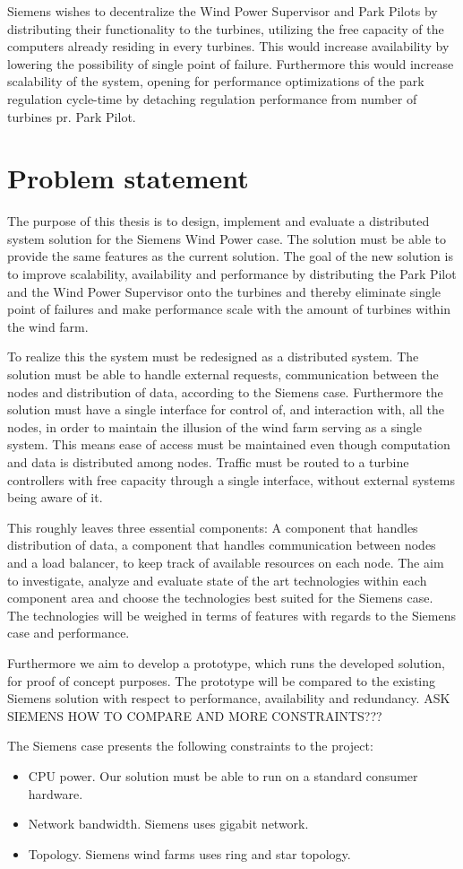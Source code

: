 Siemens wishes to decentralize the Wind Power Supervisor and Park Pilots by distributing their functionality to the turbines, utilizing the free capacity of the computers already residing in every turbines. This would increase availability by lowering the possibility of single point of failure. Furthermore this would increase scalability of the system, opening for performance optimizations of the park regulation cycle-time by detaching regulation performance from number of turbines pr. Park Pilot. 


\section{Problem statement}

The purpose of this thesis is to design, implement and evaluate a distributed system solution for the Siemens Wind Power case. The solution must be able to provide the same features as the current solution. The goal of the new solution is to improve scalability, availability and performance by distributing the Park Pilot and the Wind Power Supervisor onto the turbines and thereby eliminate single point of failures and make performance scale with the amount of turbines within the wind farm. 

To realize this the system must be redesigned as a distributed system. The solution must be able to handle external requests, communication between the nodes and distribution of data, according to the Siemens case. Furthermore the solution must have a single interface for control of, and interaction with, all the nodes, in order to maintain the illusion of the wind farm serving as a single system. This means ease of access must be maintained even though computation and data is distributed among nodes. Traffic must be routed to a turbine controllers with free capacity through a single interface, without external systems being aware of it.

This roughly leaves three essential components: A component that handles distribution of data, a component that handles communication between nodes and a load balancer, to keep track of available resources on each node. The aim to investigate, analyze and evaluate state of the art technologies within each component area and choose the technologies best suited for the Siemens case. The technologies will be weighed in terms of features with regards to the Siemens case and performance.

Furthermore we aim to develop a prototype, which runs the developed solution, for proof of concept purposes. The prototype will be compared to the existing Siemens solution with respect to performance, availability and redundancy. ASK SIEMENS HOW TO COMPARE AND MORE CONSTRAINTS??? 

The Siemens case presents the following constraints to the project:
\begin{itemize}
	\item CPU power. Our solution must be able to run on a standard consumer hardware.
	\item Network bandwidth. Siemens uses gigabit network.
	\item Topology. Siemens wind farms uses ring and star topology.
\end{itemize}

